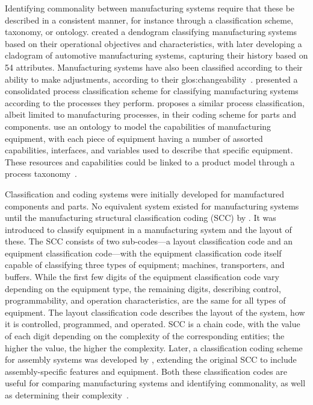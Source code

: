 Identifying commonality between manufacturing systems require that these be described in a consistent manner, for instance through a classification scheme, taxonomy, or ontology.
\textcite{McCarthy_MfgClassification} created a dendogram classifying manufacturing systems based on their operational objectives and characteristics, with \textcite{McCarthy_Cladistics} later developing a cladogram of automotive manufacturing systems, capturing their history based on 54 attributes.
Manufacturing systems have also been classified according to their ability to make adjustments, \ie{} according to their \gls{glos:changeability}~\parencite{WIENDAHL2007783,ElMaraghy2013629}.
\textcite{SorensenCMS2018} presented a consolidated process classification scheme for classifying manufacturing systems according to the processes they perform.
\textcite{Agarwal1994} proposes a similar process classification, albeit limited to manufacturing processes, in their coding scheme for parts and components.
\textcite{JARVENPAA201887} use an ontology to model the capabilities of manufacturing equipment, with each piece of equipment having a number of assorted capabilities, interfaces, and variables used to describe that specific equipment.
These resources and capabilities could be linked to a product model through a process taxonomy~\parencite{BRUNOE2018592}.

Classification and coding systems were initially developed for manufactured components and parts.
No equivalent system existed for manufacturing systems until the manufacturing structural classification coding (SCC) by \textcite{ElMaraghy2006Complexity}.
It was introduced to classify equipment in a manufacturing system and the layout of these.
The SCC consists of two sub-codes---a layout classification code and an equipment classification code---with the equipment classification code itself capable of classifying three types of equipment; machines, transporters, and buffers.
While the first few digits of the equipment classification code vary depending on the equipment type, the remaining digits, describing control, programmability, and operation characteristics, are the same for all types of equipment.
The layout classification code describes the layout of the system, how it is controlled, programmed, and operated.
SCC is a chain code, with the value of each digit depending on the complexity of the corresponding entities; the higher the value, the higher the complexity.
Later, a classification coding scheme for assembly systems was developed by \textcite{elmaraghy2010classification}, extending the original SCC to include assembly-specific features and equipment. 
Both these classification codes are useful for comparing manufacturing systems and identifying commonality, as well as determining their complexity~\parencite{Samy2012}.

